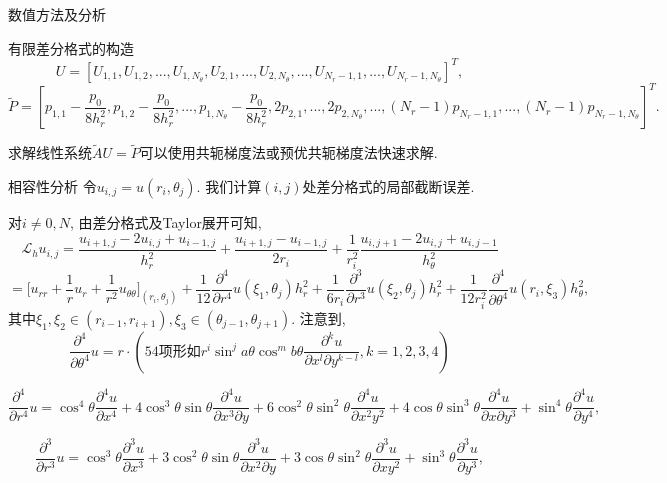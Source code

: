 \documentclass{article}
\begin{document}
\begin{section}{数值方法及分析}
\begin{subsection}{有限差分格式的构造}
        $$ U = [U_{1,1},U_{1,2},...,U_{1,N_\theta},U_{2,1},...,U_{2,N_\theta},...,U_{N_r-1,1},...,U_{N_r-1,N_\theta}]^T, $$
        $$ \tilde{P} = [p_{1,1}-\frac{p_0}{8h_r^2},p_{1,2}-\frac{p_0}{8h_r^2},...,p_{1,N_\theta}-\frac{p_0}{8h_r^2},2p_{2,1},...,2p_{2,N_\theta},...,(N_r-1)p_{N_r-1,1},...,(N_r-1)p_{N_r-1,N_\theta}]^T. $$

        求解线性系统$\tilde{A}U=\tilde{P}$可以使用共轭梯度法或预优共轭梯度法快速求解.
    \end{subsection}
    \begin{subsection}{相容性分析}
        令$u_{i,j} = u(r_i,\theta_j)$. 我们计算$(i,j)$处差分格式的局部截断误差.

        对$i\neq 0,N$, 由差分格式及Taylor展开可知, 
        $$\mathcal{L}_h u_{i,j} = \frac{u_{i+1,j}-2u_{i,j}+u_{i-1,j}}{h_r^2} + \frac{u_{i+1,j}-u_{i-1,j}}{2r_i} + \frac{1}{r_i^2}\frac{u_{i,j+1}-2u_{i,j}+u_{i,j-1}}{h_\theta^2}$$
        $$ = \bigg[u_{rr}+\frac{1}{r}u_r+\frac{1}{r^2}u_{\theta\theta}\bigg]_{(r_i,\theta_j)} + \frac{1}{12}\frac{\partial^4 }{\partial r^4}u(\xi_1,\theta_j)h_r^2 + \frac{1}{6r_i}\frac{\partial^3 }{\partial r^3}u(\xi_2,\theta_j)h_r^2 + \frac{1}{12 r_i^2}\frac{\partial^4 }{\partial \theta^4}u(r_i,\xi_3)h_\theta^2,$$
        其中$\xi_1,\xi_2\in(r_{i-1},r_{i+1}),\xi_3\in(\theta_{j-1},\theta_{j+1})$.
        注意到, $$\frac{\partial^4 }{\partial \theta^4}u = r\cdot(54\text{项形如}r^i\sin^ja\theta\cos^m b\theta\frac{\partial^k u}{\partial x^l\partial y^{k-l}},k=1,2,3,4)$$

        $$\frac{\partial^4 }{\partial r^4}u = \cos^4\theta\frac{\partial^4 u}{\partial x^4} + 4\cos^3\theta\sin\theta\frac{\partial^4 u}{\partial x^3\partial y} + 
        6\cos^2\theta\sin^2\theta\frac{\partial^4 u}{\partial x^2y^2} + 4\cos\theta\sin^3\theta\frac{\partial^4 u}{\partial x\partial y^3} + \sin^4\theta\frac{\partial^4 u}{\partial y^4},$$

        $$\frac{\partial^3 }{\partial r^3}u = \cos^3\theta\frac{\partial^3 u}{\partial x^3} + 3\cos^2\theta\sin\theta\frac{\partial^3 u}{\partial x^2\partial y} + 
        3\cos\theta\sin^2\theta\frac{\partial^3 u}{\partial xy^2} + \sin^3\theta\frac{\partial^3 u}{\partial y^3} ,$$


\end{subsection}
\end{section}
\end{document}
